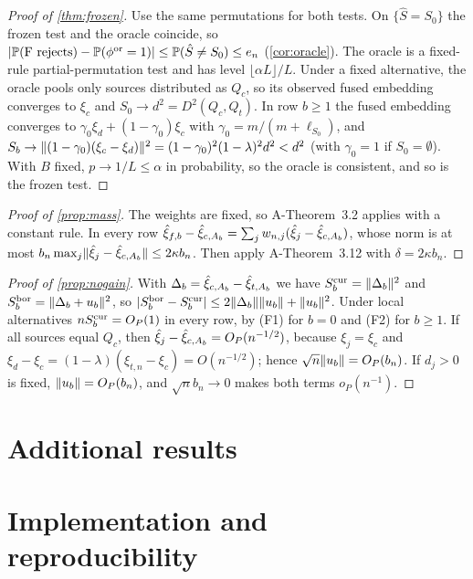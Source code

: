 \documentclass[11pt,a4paper]{article}
\begin{document}
\begin{proof}[Proof of \cref{thm:frozen}]
Use the same permutations for both tests. On $\{\hat S=S_0\}$ the frozen test and the oracle coincide, so $|\P(\text{F rejects})-\P(\phi^{\rm or}=1)|\le\P(\hat S\neq S_0)\le e_n$ (\cref{cor:oracle}). The oracle is a fixed-rule partial-permutation test and has level $\lfloor\alpha L\rfloor/L$. Under a fixed alternative, the oracle pools only sources distributed as $Q_c$, so its observed fused embedding converges to $\xi_c$ and $S_0\to d^2=D^2(Q_c,Q_t)$. In row $b\ge1$ the fused embedding converges to $\gamma_0\xi_d+(1-\gamma_0)\xi_c$ with $\gamma_0=m/(m+\ell_{S_0})$, and $S_b\to\norm{(1-\gamma_0)(\xi_c-\xi_d)}^2=(1-\gamma_0)^2(1-\lambda)^2d^2<d^2$ (with $\gamma_0=1$ if $S_0=\emptyset$). With $B$ fixed, $p\to1/L\le\alpha$ in probability, so the oracle is consistent, and so is the frozen test.
\end{proof}

\begin{proof}[Proof of \cref{prop:mass}]
The weights are fixed, so A-Theorem~3.2 applies with a constant rule. In every row $\hxi_{f,b}-\hxi_{c,A_b}=\sum_jw_{n,j}(\hxi_j-\hxi_{c,A_b})$, whose norm is at most $b_n\max_j\norm{\hxi_j-\hxi_{c,A_b}}\le2\kappa b_n$. Then apply A-Theorem~3.12 with $\delta=2\kappa b_n$.
\end{proof}

\begin{proof}[Proof of \cref{prop:nogain}]
With $\Delta_b=\hxi_{c,A_b}-\hxi_{t,A_b}$ we have $S^{\rm cur}_b=\norm{\Delta_b}^2$ and $S^{\rm bor}_b=\norm{\Delta_b+u_b}^2$, so $|S^{\rm bor}_b-S^{\rm cur}_b|\le2\norm{\Delta_b}\norm{u_b}+\norm{u_b}^2$. Under local alternatives $nS^{\rm cur}_b=O_P(1)$ in every row, by (F1) for $b=0$ and (F2) for $b\ge1$. If all sources equal $Q_c$, then $\hxi_j-\hxi_{c,A_b}=O_P(n^{-1/2})$, because $\xi_j=\xi_c$ and $\xi_d-\xi_c=(1-\lambda)(\xi_{t,n}-\xi_c)=O(n^{-1/2})$; hence $\sqrt n\norm{u_b}=O_P(b_n)$. If $d_j>0$ is fixed, $\norm{u_b}=O_P(b_n)$, and $\sqrt nb_n\to0$ makes both terms $o_P(n^{-1})$.
\end{proof}

\section{Additional results}\label{app:additional}


\section{Implementation and reproducibility}\label{app:repro}


\FloatBarrier
\clearpage

\end{document}
